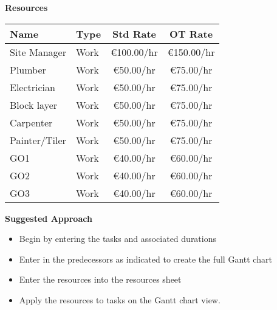 \newpage
\large\textbf{Resources}\\
\vspace{.25cm}

\begin{tabular}{|l|l|c|c|}
	\hline 
	\textbf{Name} & \textbf{Type} & \textbf{Std Rate} & \textbf{OT Rat}e \\ 
	\hline 
	Site Manager	& Work	& \euro100.00/hr & 	\euro150.00/hr\\
	Plumber			& Work	& \euro50.00/hr	& \euro75.00/hr\\
	Electrician		& Work	& \euro50.00/hr	& \euro75.00/hr\\
	Block layer		& Work	& \euro50.00/hr	& \euro75.00/hr\\
	Carpenter		& Work	& \euro50.00/hr	& \euro75.00/hr\\
	Painter/Tiler	& Work	& \euro50.00/hr	& \euro75.00/hr\\
	GO1				& Work	& \euro40.00/hr	& \euro60.00/hr\\
	GO2				& Work	& \euro40.00/hr	& \euro60.00/hr\\
	GO3				& Work	& \euro40.00/hr	& \euro60.00/hr\\
	\hline
\end{tabular} 



\vspace{.5cm}

\large\textbf{Suggested Approach}\\

\begin{itemize}
	\item Begin by entering the tasks and associated durations
	\item Enter in the predecessors as indicated to create the full Gantt chart
	\item Enter the resources into the resources sheet
	\item Apply the resources to tasks on the Gantt chart view.

\end{itemize}

